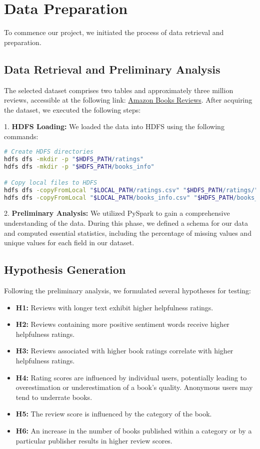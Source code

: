 \section{Data Preparation}
To commence our project, we initiated the process of data retrieval and preparation.

\subsection*{Data Retrieval and Preliminary Analysis}
The selected dataset comprises two tables and approximately three million reviews, accessible at the following link: \href{https://www.kaggle.com/datasets/mohamedbakhet/amazon-books-reviews}{Amazon Books Reviews}. After acquiring the dataset, we executed the following steps:

1. \textbf{HDFS Loading:} We loaded the data into HDFS using the following commands:

\begin{lstlisting}[language=bash, frame=single, basicstyle=\footnotesize\ttfamily, breaklines=true]
# Create HDFS directories
hdfs dfs -mkdir -p "$HDFS_PATH/ratings"
hdfs dfs -mkdir -p "$HDFS_PATH/books_info"

# Copy local files to HDFS
hdfs dfs -copyFromLocal "$LOCAL_PATH/ratings.csv" "$HDFS_PATH/ratings/"
hdfs dfs -copyFromLocal "$LOCAL_PATH/books_info.csv" "$HDFS_PATH/books_info/"
\end{lstlisting}

2. \textbf{Preliminary Analysis:} We utilized PySpark to gain a comprehensive understanding of the data. During this phase, we defined a schema for our data and computed essential statistics, including the percentage of missing values and unique values for each field in our dataset.

\subsection*{Hypothesis Generation}
Following the preliminary analysis, we formulated several hypotheses for testing:

\begin{itemize}[leftmargin=*, noitemsep]
    \item \textbf{H1:} Reviews with longer text exhibit higher helpfulness ratings.
    \item \textbf{H2:} Reviews containing more positive sentiment words receive higher helpfulness ratings.
    \item \textbf{H3:} Reviews associated with higher book ratings correlate with higher helpfulness ratings.
    \item \textbf{H4:} Rating scores are influenced by individual users, potentially leading to overestimation or underestimation of a book's quality. Anonymous users may tend to underrate books.
    \item \textbf{H5:} The review score is influenced by the category of the book.
    \item \textbf{H6:} An increase in the number of books published within a category or by a particular publisher results in higher review scores.
\end{itemize}

